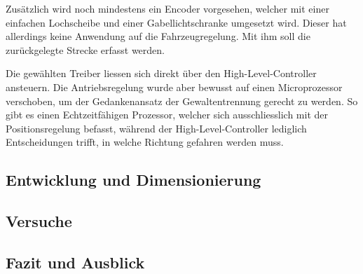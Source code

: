 \documentclass[main.tex]{subfiles} %
\begin{document}
Zusätzlich wird noch mindestens ein Encoder vorgesehen, welcher mit einer
einfachen Lochscheibe und einer Gabellichtschranke umgesetzt wird. Dieser hat
allerdings keine Anwendung auf die Fahrzeugregelung. Mit ihm soll die
zurückgelegte Strecke erfasst werden.

Die gewählten Treiber liessen sich direkt über den High-Level-Controller
ansteuern. Die Antriebsregelung wurde aber bewusst auf einen Microprozessor
verschoben, um der Gedankenansatz der Gewaltentrennung gerecht zu werden. So
gibt es einen Echtzeitfähigen Prozessor, welcher sich ausschliesslich mit der
Positionsregelung befasst, während der High-Level-Controller lediglich
Entscheidungen trifft, in welche Richtung gefahren werden muss.

\subsection*{Entwicklung und Dimensionierung}

\subsection*{Versuche}

\subsection*{Fazit und Ausblick}
\end{document}
